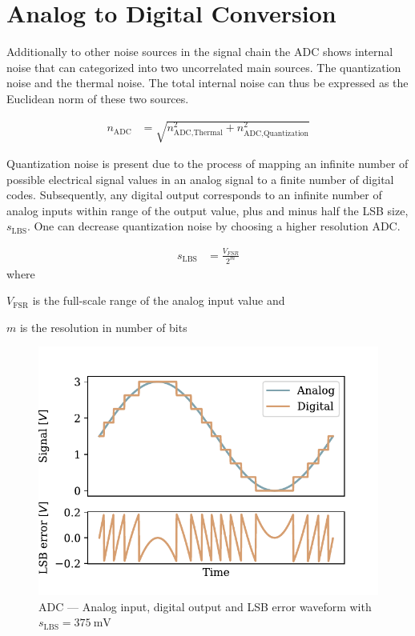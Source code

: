 \section{Analog to Digital Conversion}

Additionally to other noise sources in the signal chain the \ac{ADC} shows internal noise that can categorized into two uncorrelated main sources. The quantization noise and the thermal noise. The total internal noise can thus be expressed as the Euclidean norm of these two sources.

\begin{align}
  n_\text{ADC} &= \sqrt{n_{\text{ADC},\text{Thermal}}^2 + n_{\text{ADC},\text{Quantization}}^2}
\end{align}

Quantization noise is present due to the process of mapping an infinite number of possible electrical signal values in an analog signal to a finite number of digital codes. Subsequently, any digital output corresponds to an infinite number of analog inputs within range of the output value, plus and minus half the \ac{LSB} size, $s_\text{LBS}$. One can decrease quantization noise by choosing a higher resolution \ac{ADC}.

\begin{align}
  s_\text{LBS} &= \frac{V_{FSR}}{2^m}
\end{align}
where
\begin{description}[topsep=0ex, noitemsep]
  \item $V_{\text{FSR}}$ is the full-scale range of the analog input value and
  \item $m$ is the resolution in number of bits
\end{description}

\begin{figure}[!htb]
  \centering
  \includegraphics[scale=0.72]{figures/electronics/adc/plot_lsberr}
  \caption[ADC LSB waveform]{\ac{ADC} --- Analog input, digital output and \ac{LSB} error waveform with $s_\text{LBS} = \SI{375}{\milli\volt}$\cite{hall2020fund}%
    \label{fig:plot_lsberr}}
\end{figure}


